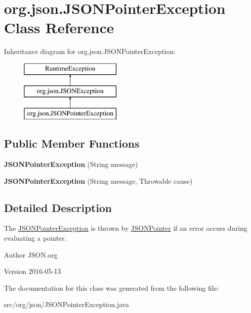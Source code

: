 \hypertarget{classorg_1_1json_1_1JSONPointerException}{\section{org.\-json.\-J\-S\-O\-N\-Pointer\-Exception Class Reference}
\label{classorg_1_1json_1_1JSONPointerException}
}
Inheritance diagram for org.\-json.\-J\-S\-O\-N\-Pointer\-Exception\-:\begin{figure}[H]
\begin{center}
\leavevmode
\includegraphics[height=3.000000cm]{classorg_1_1json_1_1JSONPointerException}
\end{center}
\end{figure}
\subsection*{Public Member Functions}
\begin{DoxyCompactItemize}
\item 
\hypertarget{classorg_1_1json_1_1JSONPointerException_a40c9016543b1a2a8c6acd0a26e408ae8}{{\bfseries J\-S\-O\-N\-Pointer\-Exception} (String message)}\label{classorg_1_1json_1_1JSONPointerException_a40c9016543b1a2a8c6acd0a26e408ae8}

\item 
\hypertarget{classorg_1_1json_1_1JSONPointerException_a0607a3e0ff2baa49734981af31b92c06}{{\bfseries J\-S\-O\-N\-Pointer\-Exception} (String message, Throwable cause)}\label{classorg_1_1json_1_1JSONPointerException_a0607a3e0ff2baa49734981af31b92c06}

\end{DoxyCompactItemize}


\subsection{Detailed Description}
The \hyperlink{classorg_1_1json_1_1JSONPointerException}{J\-S\-O\-N\-Pointer\-Exception} is thrown by \hyperlink{classorg_1_1json_1_1JSONPointer}{J\-S\-O\-N\-Pointer} if an error occurs during evaluating a pointer.

\begin{DoxyAuthor}{Author}
J\-S\-O\-N.\-org 
\end{DoxyAuthor}
\begin{DoxyVersion}{Version}
2016-\/05-\/13 
\end{DoxyVersion}


The documentation for this class was generated from the following file\-:\begin{DoxyCompactItemize}
\item 
src/org/json/J\-S\-O\-N\-Pointer\-Exception.\-java\end{DoxyCompactItemize}
